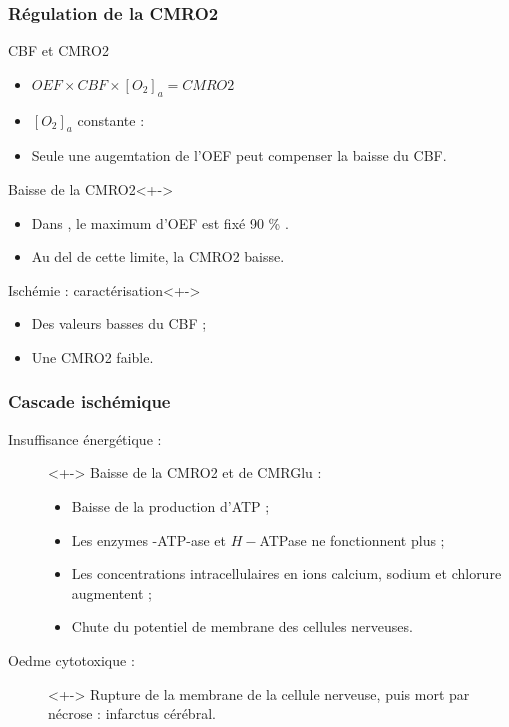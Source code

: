 \begin{frame}
\frametitle{R\'egulation de la CMRO2}
\begin{block}{CBF et CMRO2}
\begin{itemize}
\item $OEF\times CBF\times [O_2]_a=CMRO2$
\item<+-> $[O_2]_a$ constante :
\item<+-> Seule une augemtation de l'OEF peut compenser la baisse du CBF.
\end{itemize}
\end{block}
\end{frame}

\begin{frame}
%
\begin{block}{Baisse de la CMRO2}<+->
\begin{itemize}
\item<+-> Dans \cite{Duval_JCBFM_02}, le maximum d'OEF est fix\'e  90 \% .
\item<+-> Au del de cette limite, la CMRO2 baisse.
\end{itemize}
\end{block}

\begin{block}{Isch\'emie : caract\'erisation}<+->
\begin{itemize}
\item<+-> Des valeurs basses du CBF ;
\item<+-> Une CMRO2 faible.
\end{itemize}
\end{block}
%
\end{frame}

\begin{frame}
\frametitle{Cascade isch\'emique}
\begin{description}
\item[Insuffisance \'energ\'etique :]<+-> Baisse de la CMRO2 et de CMRGlu :
\begin{itemize}
\item Baisse de la production d'ATP ;
\item Les enzymes -ATP-ase et $H-$ATPase ne fonctionnent plus ;
\item Les concentrations intracellulaires en ions calcium, sodium et chlorure augmentent ;
\item Chute du potentiel de membrane des cellules nerveuses.
\end{itemize}
%
\item[Oedme cytotoxique :]<+-> Rupture de la membrane de la cellule nerveuse, puis mort par n\'ecrose : infarctus c\'er\'ebral.
\end{description}
\end{frame}

